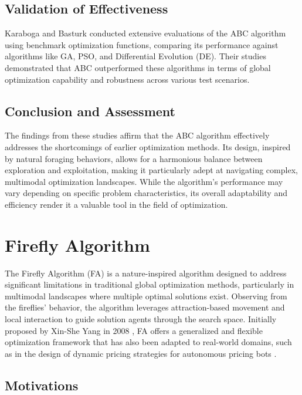 \documentclass[a4paper, 12pt]{extarticle}
\begin{document}
\subsection{Validation of Effectiveness}
Karaboga and Basturk conducted extensive evaluations of the ABC algorithm using benchmark optimization functions, comparing its performance against algorithms like GA, PSO, and Differential Evolution (DE). Their studies demonstrated that ABC outperformed these algorithms in terms of global optimization capability and robustness across various test scenarios.\cite{karaboga2007powerful}\cite{karaboga2007artificial}

\subsection{Conclusion and Assessment}
The findings from these studies affirm that the ABC algorithm effectively addresses the shortcomings of earlier optimization methods. Its design, inspired by natural foraging behaviors, allows for a harmonious balance between exploration and exploitation, making it particularly adept at navigating complex, multimodal optimization landscapes. While the algorithm's performance may vary depending on specific problem characteristics, its overall adaptability and efficiency render it a valuable tool in the field of optimization.\cite{kaya2022review}

\newpage
\section{Firefly Algorithm} 

The Firefly Algorithm (FA) is a nature-inspired algorithm designed to address significant limitations in traditional global optimization methods, particularly in multimodal landscapes where multiple optimal solutions exist. Observing from the fireflies’ behavior, the algorithm leverages attraction-based movement and local interaction to guide solution agents through the search space. Initially proposed by Xin-She Yang in 2008 \cite{yang2009firefly}, FA offers a generalized and flexible optimization framework that has also been adapted to real-world domains, such as in the design of dynamic pricing strategies for autonomous pricing bots \cite{jumadinova2008firefly}. 

\subsection{Motivations}
\end{document}
